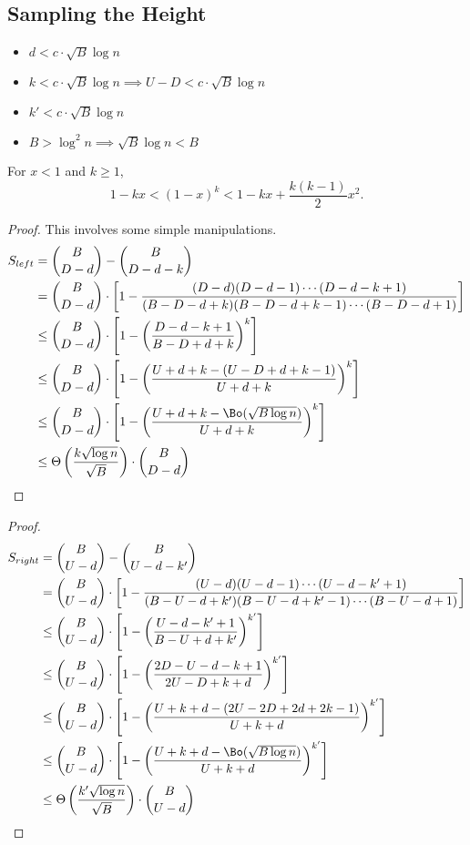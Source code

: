 \subsection{Sampling the Height}%
\label{sec:sampling_the_height}


\begin{itemize}
    \item $d < c\cdot \sqrt B \log n$
    \item $k < c\cdot \sqrt B \log n \implies U-D < c\cdot \sqrt B \log n$
    \item $k' < c\cdot \sqrt B \log n$
    \item $B > \log^2 n \implies \sqrt B \log n < B$
\end{itemize}

\begin{lemma}
\label{lem:taylor_bound}
For $x < 1$ and $k\ge 1$,
\[
1-kx < (1-x)^k < 1 - kx + \frac{k(k-1)}{2}x^2.
\]
\end{lemma}


\DLeftBound*
\begin{proof}
This involves some simple manipulations.
\begin{align}
S_{left} &= {{B}\choose{D-d}}-{{B}\choose{D-d-k}}\\
&= {{B}\choose{D-d}}\cdot \left[1-\frac{(D-d)(D-d-1)\cdots(D-d-k+1)}{(B-D-d+k)(B-D-d+k-1)\cdots(B-D-d+1)}\right]\\
&\le {{B}\choose{D-d}}\cdot \left[1-\left(\frac{D-d-k+1}{B-D+d+k}\right)^k\right]\\
&\le {{B}\choose{D-d}}\cdot \left[1-\left(\frac{U+d+k-(U-D+d+k-1)}{U+d+k}\right)^k\right]\\
&\le {{B}\choose{D-d}}\cdot \left[1-\left(\frac{U+d+k-\Bo(\sqrt{B\log n})}{U+d+k}\right)^k\right]\\
&\le \Theta \left( \frac{k\sqrt{\log n}}{\sqrt{B}} \right) \cdot{{B}\choose{D-d}}
\end{align}
\end{proof}

\DRightBound*
\begin{proof}
\begin{align}
S_{right} &= {{B}\choose{U-d}}-{{B}\choose{U-d-k'}}\\
&= {{B}\choose{U-d}}\cdot \left[1-\frac{(U-d)(U-d-1)\cdots(U-d-k'+1)}{(B-U-d+k')(B-U-d+k'-1)\cdots(B-U-d+1)}\right]\\
&\le {{B}\choose{U-d}}\cdot \left[1-\left(\frac{U-d-k'+1}{B-U+d+k'}\right)^{k'}\right]\\
&\le {{B}\choose{U-d}}\cdot \left[1-\left(\frac{2D-U-d-k+1}{2U-D+k+d}\right)^{k'}\right]\\
&\le {{B}\choose{U-d}}\cdot \left[1-\left(\frac{U+k+d - (2U-2D+2d+2k-1)}{U+k+d}\right)^{k'}\right]\\
&\le {{B}\choose{U-d}}\cdot \left[1-\left(\frac{U+k+d - \Bo(\sqrt{B\log n})}{U+k+d}\right)^{k'}\right]\\
&\le \Theta\left(\frac{k'\sqrt{\log n}}{\sqrt{B}}\right)\cdot{{B}\choose{U-d}}
\end{align}
\end{proof}

